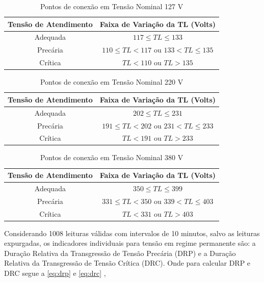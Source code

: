 \begin{table}[H]
  \centering
  \caption{Pontos de conexão em Tensão Nominal 127 V}
  \label{tab:tensao_127}
  \begin{tabular}{@{}cc@{}}
  \toprule
  \textbf{Tensão de Atendimento} & \textbf{Faixa de Variação da TL (Volts)} \\ \midrule
  Adequada & $117 \leq TL \leq 133$ \\
  Precária & $110 \leq TL < 117$ ou $133 < TL \leq 135$ \\
  Crítica & $TL < 110$ ou $TL > 135$ \\ \bottomrule
  \end{tabular}
\end{table}

\begin{table}[H]
  \centering
  \caption{Pontos de conexão em Tensão Nominal 220 V}
  \label{tab:tensao_220}
  \begin{tabular}{@{}cc@{}}
  \toprule
  \textbf{Tensão de Atendimento} & \textbf{Faixa de Variação da TL (Volts)} \\ \midrule
  Adequada & $202 \leq TL \leq 231$ \\
  Precária & $191 \leq TL < 202$ ou $231 < TL \leq 233$ \\
  Crítica & $TL < 191$ ou $TL > 233$ \\ \bottomrule
  \end{tabular}
\end{table}

\begin{table}[H]
  \centering
  \caption{Pontos de conexão em Tensão Nominal 380 V}
  \label{tab:tensao_380}
  \begin{tabular}{@{}cc@{}}
  \toprule
  \textbf{Tensão de Atendimento} & \textbf{Faixa de Variação da TL (Volts)} \\ \midrule
  Adequada & $350 \leq TL \leq 399$ \\
  Precária & $331 \leq TL < 350$ ou $339 < TL \leq 403$ \\
  Crítica & $TL < 331$ ou $TL > 403$ \\ \bottomrule
  \end{tabular}
\end{table}

Considerando 1008 leituras válidas com intervalos de 10 minutos, salvo as leituras expurgadas, os indicadores individuais para tensão em regime permanente são: a Duração Relativa da Transgressão de Tensão Precária (DRP) e a Duração Relativa da Transgressão de Tensão Crítica (DRC). Onde para calcular DRP e DRC segue a \autoref{eq:drp} e \autoref{eq:drc} \cite{ref:ANEEL2021},

